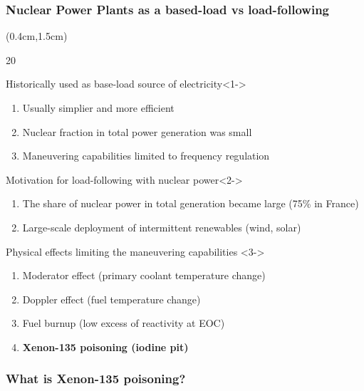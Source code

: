 \begin{frame}
\frametitle{Nuclear Power Plants as a based-load vs load-following}
\begin{textblock*}{12cm}(0.4cm,1.5cm) %
\begin{overlayarea}{\linewidth}{20\baselineskip}
	\begin{block}{Historically used as base-load source of electricity}<1->
		\begin{enumerate}
			\item Usually simplier and more efficient
			\item Nuclear fraction in total power generation was small
			\item Maneuvering capabilities limited to frequency regulation
		\end{enumerate}
	\end{block}
	\begin{block}{Motivation for load-following with nuclear power}<2->
	\begin{enumerate}
		\item The share of nuclear power in total generation became large 
		(75\% in France)
		\item Large-scale deployment of intermittent renewables (wind, solar)
	\end{enumerate}
	\end{block}
	\begin{block}{Physical effects limiting the maneuvering capabilities 
		\cite{lokhov_technical_2011}}<3->
	\begin{enumerate}
		\item<3-> Moderator effect (primary coolant temperature change)
		\item<3-> Doppler effect (fuel temperature change)
		\item<4-> Fuel burnup (low excess of reactivity at EOC)
		\item<5-> \textbf{Xenon-135 poisoning (iodine pit)}
	\end{enumerate}
\end{block}
\end{overlayarea}
\end{textblock*}
\end{frame}

\begin{frame}
\frametitle{What is Xenon-135 poisoning?}
\end{frame}

